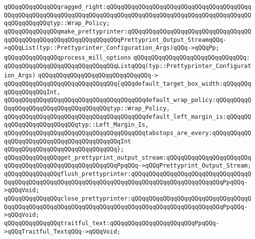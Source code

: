 \verb|qQQqqQQqqQQqqQQqragged_right:qQQqqQQqqQQqqQQqqQQqqQQqqQQqqQQqqQQqqQQqqQQqqQQqqQQqqQQqqQQqqQQqqQQqqQQqqQQqqQQqqQQqqQQqqQQqqQQqqQQqqQQqqQQqqQQqqQQqqQQqqQQqtyp::Wrap_Policy;|\newline
\newline
\verb|qQQqqQQqqQQqqQQqmake_prettyprinter:qQQqqQQqqQQqqQQqqQQqqQQqqQQqqQQqqQQqqQQqqQQqqQQqqQQqqQQqqQQqqQQqqQQqPrettyprint_Output_StreamqQQq->qQQqList(typ::Prettyprinter_Configuration_Args)qQQq->qQQqPp;|\newline
\newline
\verb|qQQqqQQqqQQqqQQqprocess_mill_options|\newline
\verb|qQQqqQQqqQQqqQQqqQQqqQQqqQQqqQQq:|\newline
\verb|qQQqqQQqqQQqqQQqqQQqqQQqqQQqqQQqListqQQq(typ::Prettyprinter_Configuration_Args)|\newline
\verb|qQQqqQQqqQQqqQQqqQQqqQQqqQQqqQQq->|\newline
\verb|qQQqqQQqqQQqqQQqqQQqqQQqqQQqqQQq{qQQqdefault_target_box_width:qQQqqQQqqQQqqQQqqQQqInt,|\newline
\verb|qQQqqQQqqQQqqQQqqQQqqQQqqQQqqQQqqQQqqQQqdefault_wrap_policy:qQQqqQQqqQQqqQQqqQQqqQQqqQQqqQQqqQQqqQQqtyp::Wrap_Policy,|\newline
\verb|qQQqqQQqqQQqqQQqqQQqqQQqqQQqqQQqqQQqqQQqdefault_left_margin_is:qQQqqQQqqQQqqQQqqQQqqQQqqQQqtyp::Left_Margin_Is,|\newline
\verb|qQQqqQQqqQQqqQQqqQQqqQQqqQQqqQQqqQQqqQQqtabstops_are_every:qQQqqQQqqQQqqQQqqQQqqQQqqQQqqQQqqQQqqQQqqQQqInt|\newline
\verb|qQQqqQQqqQQqqQQqqQQqqQQqqQQqqQQq};|\newline
\newline
\verb|qQQqqQQqqQQqqQQqget_prettyprint_output_stream:qQQqqQQqqQQqqQQqqQQqqQQqqQQqqQQqqQQqqQQqqQQqqQQqqQQqqQQqPpqQQq->qQQqPrettyprint_Output_Stream;|\newline
\newline
\verb|qQQqqQQqqQQqqQQqflush_prettyprinter:qQQqqQQqqQQqqQQqqQQqqQQqqQQqqQQqqQQqqQQqqQQqqQQqqQQqqQQqqQQqqQQqqQQqqQQqqQQqqQQqqQQqqQQqqQQqqQQqPpqQQq->qQQqVoid;|\newline
\verb|qQQqqQQqqQQqqQQqclose_prettyprinter:qQQqqQQqqQQqqQQqqQQqqQQqqQQqqQQqqQQqqQQqqQQqqQQqqQQqqQQqqQQqqQQqqQQqqQQqqQQqqQQqqQQqqQQqqQQqqQQqPpqQQq->qQQqVoid;|\newline
\newline
\verb|qQQqqQQqqQQqqQQqtraitful_text:qQQqqQQqqQQqqQQqqQQqqQQqPpqQQq->qQQqTraitful_TextqQQq->qQQqVoid;|\newline
